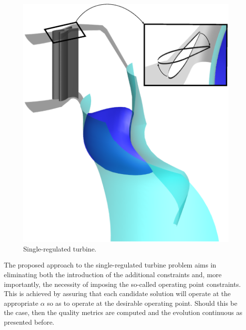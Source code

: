 \begin{figure}[h!]
\centering
\includegraphics[width=.8\textwidth]{SINGLE.eps}
\caption{Single-regulated turbine.}
\label{signle}
\end{figure}


The proposed approach to the single-regulated turbine problem aims in eliminating both the introduction of the additional constraints and, more importantly, the necessity of imposing the so-called operating point constraints. This is achieved by assuring that each candidate solution will operate at the appropriate $\alpha$ so as to operate at the desirable operating point. Should this be the case, then the quality metrics are computed and the evolution continuous as presented before. 

